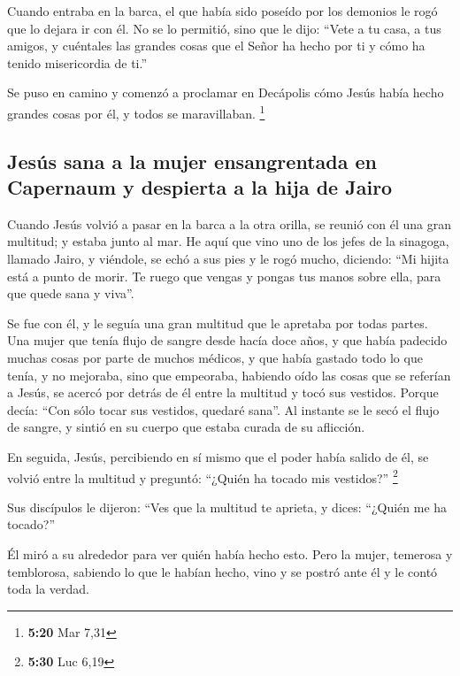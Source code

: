 \begin{paracol}{2}
 Cuando entraba en la barca, el que había sido poseído
por los demonios le rogó que lo dejara ir con él.  No se
lo permitió, sino que le dijo: ``Vete a tu casa, a tus amigos, y
cuéntales las grandes cosas que el Señor ha hecho por ti y cómo ha
tenido misericordia de ti.''

 Se puso en camino y comenzó a proclamar en Decápolis
cómo Jesús había hecho grandes cosas por él, y todos se maravillaban.
\footnote{\textbf{5:20} Mar 7,31}

\hypertarget{jesuxfas-sana-a-la-mujer-ensangrentada-en-capernaum-y-despierta-a-la-hija-de-jairo}{%
\subsection{Jesús sana a la mujer ensangrentada en Capernaum y despierta
a la hija de
Jairo}\label{jesuxfas-sana-a-la-mujer-ensangrentada-en-capernaum-y-despierta-a-la-hija-de-jairo}}

 Cuando Jesús volvió a pasar en la barca a la otra
orilla, se reunió con él una gran multitud; y estaba junto al mar.
 He aquí que vino uno de los jefes de la sinagoga,
llamado Jairo, y viéndole, se echó a sus pies  y le rogó
mucho, diciendo: ``Mi hijita está a punto de morir. Te ruego que vengas
y pongas tus manos sobre ella, para que quede sana y viva''.

 Se fue con él, y le seguía una gran multitud que le
apretaba por todas partes.  Una mujer que tenía flujo de
sangre desde hacía doce años,  y que había padecido
muchas cosas por parte de muchos médicos, y que había gastado todo lo
que tenía, y no mejoraba, sino que empeoraba,  habiendo
oído las cosas que se referían a Jesús, se acercó por detrás de él entre
la multitud y tocó sus vestidos.  Porque decía: ``Con
sólo tocar sus vestidos, quedaré sana''.  Al instante se
le secó el flujo de sangre, y sintió en su cuerpo que estaba curada de
su aflicción.

 En seguida, Jesús, percibiendo en sí mismo que el poder
había salido de él, se volvió entre la multitud y preguntó: ``¿Quién ha
tocado mis vestidos?'' \footnote{\textbf{5:30} Luc 6,19}

 Sus discípulos le dijeron: ``Ves que la multitud te
aprieta, y dices: ``¿Quién me ha tocado?''

 Él miró a su alrededor para ver quién había hecho esto.
 Pero la mujer, temerosa y temblorosa, sabiendo lo que le
habían hecho, vino y se postró ante él y le contó toda la verdad.


\end{paracol}
